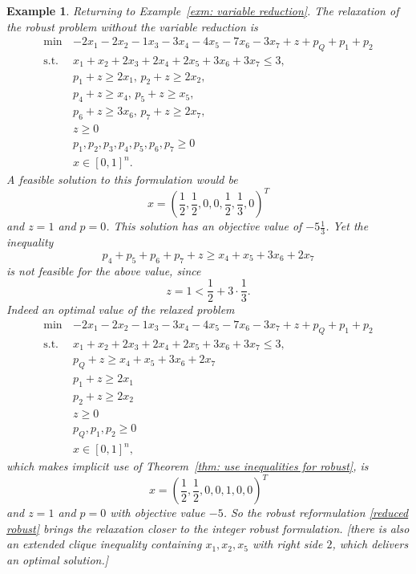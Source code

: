 \documentclass[titlepage, a4paper]{amsbook}
\theoremstyle{plain}
\theoremstyle{break}
\newtheorem{exm}[thm]{Example}
\theoremstyle{definition}
\theoremstyle{remark}
\numberwithin{equation}{thm}
\begin{document}
\begin{exm}\label{exm:variable reduction continued}
Returning to Example~\ref{exm: variable reduction}. The relaxation of the robust problem without the variable reduction is
\begin{equation*}
\begin{split}
    \min\, &-2x_1-2x_2-1x_3-3x_4-4x_5-7x_6-3x_7 + z + p_Q + p_1 +p_2\\
    \text{s.t. } &x_1+x_2+2x_3+2x_4+2x_5+3x_6+3x_7 \leq 3, \\
    &p_1 + z \geq 2x_1, \,
    p_2 + z \geq 2x_2, \\
    &p_4 + z \geq x_4, \,
    p_5 + z \geq x_5, \\
    &p_6 + z \geq 3x_6, \,
    p_7 + z \geq 2x_7, \\
    &z \geq 0 \\
    &p_1,p_2,p_3,p_4,p_5,p_6,p_7 \geq 0 \\
    &x \in [0,1]^n.
\end{split}
\end{equation*}
A feasible solution to this formulation would be \[x=(\frac{1}{2}, \frac{1}{2},0, 0, \frac{1}{2}, \frac{1}{3},0)^T\]
and $z=1$ and $p=0$. This solution has an objective value of $-5\frac{1}{3}$.
Yet the inequality 
\[p_4 + p_5+ p_6 + p_7 + z \geq x_4 + x_5 + 3x_6+ 2x_7\]
is not feasible for the above value, since 
\[z=1 < \frac{1}{2} + 3 \cdot\frac{1}{3}.\]
Indeed an optimal value of the relaxed problem
\begin{equation*}
\begin{split}
    \min\, &-2x_1-2x_2-1x_3-3x_4-4x_5-7x_6-3x_7 + z + p_Q + p_1 +p_2\\
    \text{s.t. } &x_1+x_2+2x_3+2x_4+2x_5+3x_6+3x_7 \leq 3, \\
    &p_Q + z \geq x_4 + x_5 + 3x_6+ 2x_7 \\
    &p_1 + z \geq 2x_1 \\
    &p_2 + z \geq 2x_2 \\
    &z \geq 0 \\
    &p_Q,p_1,p_2 \geq 0 \\
    &x \in [0,1]^n,
\end{split}
\end{equation*}
which makes implicit use of Theorem~\ref{thm: use inequalities for robust}, is 
\[x=(\frac{1}{2},\frac{1}{2},0,0,1,0,0)^T\]
and $z=1$ and $p=0$ with objective value $-5$.
So the robust reformulation \eqref{reduced robust} brings the relaxation closer to the integer robust formulation. 
[there is also an extended clique inequality containing $x_1,x_2,x_5$ with right side $2$, which delivers an optimal solution.]
\end{exm}
\end{document}
